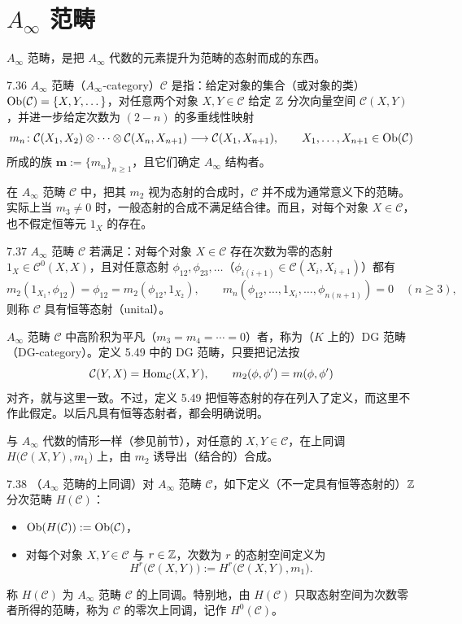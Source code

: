 \section{$A_\infty$ 范畴}

$A_\infty$ 范畴，是把 $A_\infty$ 代数的元素提升为范畴的态射而成的东西。

\begin{definition}{7.36}
$A_\infty$ 范畴（$A_\infty$-category）$\mathcal C$ 是指：给定对象的集合（或对象的类）$\operatorname{Ob}(\mathcal C)=\{X,Y,\dots\}$，对任意两个对象 $X,Y\in\mathcal C$ 给定 $\mathbb{Z}$ 分次向量空间 $\mathcal C(X,Y)$，并进一步给定次数为 $(2-n)$ 的多重线性映射
\[
  m_{n}\colon\mathcal C(X_{1},X_{2})\otimes\cdots\otimes\mathcal C(X_{n},X_{n+1})\longrightarrow\mathcal C(X_{1},X_{n+1}),\qquad X_{1},\dots,X_{n+1}\in\operatorname{Ob}(\mathcal C)
\]
所成的族 $\mathbf m:=\{m_{n}\}_{n\ge 1}$，且它们确定 $A_\infty$ 结构者。
\end{definition}

在 $A_\infty$ 范畴 $\mathcal C$ 中，把其 $m_{2}$ 视为态射的合成时，$\mathcal C$ 并不成为通常意义下的范畴。实际上当 $m_{3}\ne 0$ 时，一般态射的合成不满足结合律。而且，对每个对象 $X\in\mathcal C$，也不假定恒等元 $1_{X}$ 的存在。

\begin{definition}{7.37}
$A_\infty$ 范畴 $\mathcal C$ 若满足：对每个对象 $X\in\mathcal C$ 存在次数为零的态射 $1_{X}\in\mathcal C^{0}(X,X)$，且对任意态射 $\phi_{12},\phi_{23},\dots$（$\phi_{i(i+1)}\in\mathcal C(X_{i},X_{i+1})$）都有
\[
  m_{2}(1_{X_{1}},\phi_{12})=\phi_{12}=m_{2}(\phi_{12},1_{X_{2}}),\qquad
  m_{n}(\phi_{12},\dots,1_{X_{i}},\dots,\phi_{n(n+1)})=0\quad(n\ge 3),
\]
则称 $\mathcal C$ 具有恒等态射（unital）。
\end{definition}

$A_\infty$ 范畴 $\mathcal C$ 中高阶积为平凡（$m_{3}=m_{4}=\cdots=0$）者，称为（$K$ 上的）DG 范畴（DG-category）。定义 5.49 中的 DG 范畴，只要把记法按
\[
  \mathcal C(Y,X)=\operatorname{Hom}_{\mathcal C}(X,Y),\qquad m_{2}(\phi,\phi')=m(\phi,\phi')
\]
对齐，就与这里一致。不过，定义 5.49 把恒等态射的存在列入了定义，而这里不作此假定。以后凡具有恒等态射者，都会明确说明。

与 $A_\infty$ 代数的情形一样（参见前节），对任意的 $X,Y\in\mathcal C$，在上同调 $H\bigl(\mathcal C(X,Y),m_{1}\bigr)$ 上，由 $m_{2}$ 诱导出（结合的）合成。

\begin{definition}{7.38}
（$A_\infty$ 范畴的上同调）对 $A_\infty$ 范畴 $\mathcal C$，如下定义（不一定具有恒等态射的）$\mathbb{Z}$ 分次范畴 $H(\mathcal C)$：
\begin{itemize}[leftmargin=1.6em,itemsep=1pt,topsep=1pt]
  \item $\operatorname{Ob}(H(\mathcal C)):=\operatorname{Ob}(\mathcal C)$，
  \item 对每个对象 $X,Y\in\mathcal C$ 与 $r\in\mathbb{Z}$，次数为 $r$ 的态射空间定义为
  \[
    H^{r}\bigl(\mathcal C(X,Y)\bigr):=H^{r}\bigl(\mathcal C(X,Y),m_{1}\bigr).
  \]
\end{itemize}
称 $H(\mathcal C)$ 为 $A_\infty$ 范畴 $\mathcal C$ 的上同调。特别地，由 $H(\mathcal C)$ 只取态射空间为次数零者所得的范畴，称为 $\mathcal C$ 的零次上同调，记作 $H^{0}(\mathcal C)$。
\end{definition}

